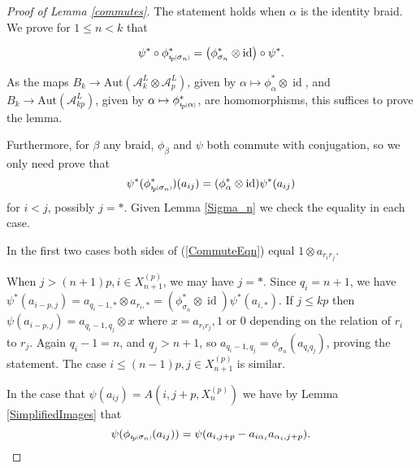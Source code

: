 \documentclass[11pt]{amsart}
\def\A{{\mathcal A}}
\def\s{{\sigma}}
\def\a{\alpha}
\newcommand*{\subsmallp}[1]{\scalebox{.5}{\ensuremath#1}}
\newcommand{\subpp}[2][p]{\imath_{\hspace*{-1pt}#1}\hspace*{-.5pt}\subsmallp(#2\subsmallp)}
\newcommand\id{\operatorname{id}}
\theoremstyle{definition}
\newtheorem{rem}[thm]{Remark}
\begin{document}
\begin{proof} [Proof of Lemma \ref{commutes}]
The statement holds when $\alpha$ is the identity braid. We prove for $1\le n < k$ that

$$\psi^\ast\circ\phi^\ast_{\subpp{\s_n}} = \left(\phi^\ast_{\s_n}\otimes \id\right)\circ\psi^\ast.$$

As the maps $B_{k} \to \text{Aut}(\A_k^L\otimes\A_p^L)$, given by $\alpha \mapsto \phi^\ast_\alpha\otimes\id$, and $B_k \to \text{Aut}(\A_{kp}^L)$, given by $\alpha \mapsto \phi^\ast_{\subpp\alpha}$, are homomorphisms, this suffices to prove the lemma. %

Furthermore, for $\beta$ any braid, $\phi_\beta$ and $\psi$ both commute with conjugation, so we only need prove that 
      \begin{equation}\label{CommuteEqn}
      \psi^\ast(\phi^\ast_{\subpp{\s_n}})(a_{ij})=(\phi^\ast_\alpha\otimes\id)\psi^\ast(a_{ij})
      \end{equation}
for $i<j$, possibly $j=\ast$. Given Lemma \ref{Sigma_n} we check the equality in each case. 

In the first two cases both sides of (\ref{CommuteEqn}) equal $1\otimes a_{r_ir_j}$. 

When $j>(n+1)p, i\in X_{n+1}^{(p)}$, we may have $j=\ast$. Since $q_i=n+1$, we have $\psi^\ast(a_{i-p,j})=a_{q_i-1,\ast}\otimes a_{r_i,\ast}=(\phi^\ast_{\s_n}\otimes\id)\psi^\ast(a_{i,\ast})$. If $j\le kp$ then $\psi(a_{i-p,j}) = a_{q_i-1,q_j}\otimes x$ where $x=a_{r_ir_j}, 1$ or $0$ depending on the relation of $r_i$ to $r_j$. Again $q_i-1=n$, and $q_j>n+1$, so $a_{q_i-1,q_j}=\phi_{\s_n}(a_{q_iq_j})$, proving the statement. The case $i\le (n-1)p,j\in X_{n+1}^{(p)}$ is similar.

In the case that $\psi(a_{ij}) = A(i,j+p,X_n^{(p)})$ we have by Lemma \ref{SimplifiedImages} that
$$\psi(\phi_{\subpp{\s_n}}(a_{ij})) = \psi(a_{i,j+p}-a_{i\a_i}a_{\a_i,j+p}).$$



\end{proof}
\end{document}
